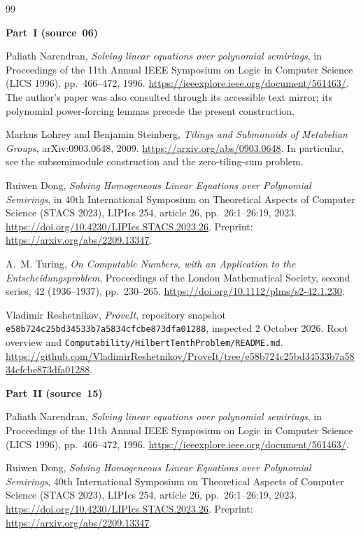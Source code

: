 \documentclass[11pt,letterpaper]{article}
\numberwithin{equation}{section}
\theoremstyle{definition}
\begin{document}
\begin{thebibliography}{99}
\item[] \textbf{Part~I (source~06)}

Paliath Narendran,
\emph{Solving linear equations over polynomial semirings},
in Proceedings of the 11th Annual IEEE Symposium on Logic in Computer
Science (LICS 1996), pp.~466--472, 1996.
\url{https://ieeexplore.ieee.org/document/561463/}.
The author's paper was also consulted through its accessible text mirror;
its polynomial power-forcing lemmas precede the present construction.

Markus Lohrey and Benjamin Steinberg,
\emph{Tilings and Submonoids of Metabelian Groups},
arXiv:0903.0648, 2009.
\url{https://arxiv.org/abs/0903.0648}.
In particular, see the subsemimodule construction and the zero-tiling-sum
problem.

Ruiwen Dong,
\emph{Solving Homogeneous Linear Equations over Polynomial Semirings},
in 40th International Symposium on Theoretical Aspects of Computer Science
(STACS 2023), LIPIcs 254, article 26, pp.~26:1--26:19, 2023.
\url{https://doi.org/10.4230/LIPIcs.STACS.2023.26}.
Preprint: \url{https://arxiv.org/abs/2209.13347}.

A.~M. Turing,
\emph{On Computable Numbers, with an Application to the
Entscheidungsproblem},
Proceedings of the London Mathematical Society, second series,
42 (1936--1937), pp.~230--265.
\url{https://doi.org/10.1112/plms/s2-42.1.230}.

Vladimir Reshetnikov,
\emph{ProveIt}, repository snapshot
\texttt{e58b724c25bd34533b7a5834cfcbe873dfa01288},
inspected 2 October 2026.
Root overview and \texttt{Computability/HilbertTenthProblem/README.md}.
\url{https://github.com/VladimirReshetnikov/ProveIt/tree/e58b724c25bd34533b7a5834cfcbe873dfa01288}.

\item[] \textbf{Part~II (source~15)}

Paliath Narendran,
\emph{Solving linear equations over polynomial semirings},
in Proceedings of the 11th Annual IEEE Symposium on Logic in Computer
Science (LICS 1996), pp.~466--472, 1996.
\url{https://ieeexplore.ieee.org/document/561463/}.

Ruiwen Dong,
\emph{Solving Homogeneous Linear Equations over Polynomial Semirings},
40th International Symposium on Theoretical Aspects of Computer Science
(STACS 2023), LIPIcs 254, article 26, pp.~26:1--26:19, 2023.
\url{https://doi.org/10.4230/LIPIcs.STACS.2023.26}.
Preprint: \url{https://arxiv.org/abs/2209.13347}.


\end{thebibliography}
\end{document}
